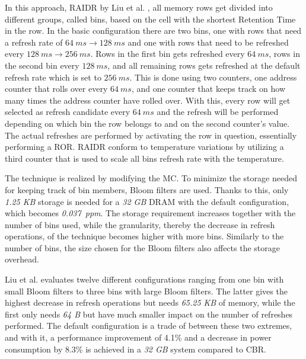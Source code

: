 In this approach, RAIDR by Liu et al. \cite{raidr}, all memory rows get divided into different groups, called bins, based on the cell with the shortest Retention Time in the row. In the basic configuration there are two bins, one with rows that need a refresh rate of $64\:ms \to 128\:ms$ and one with rows that need to be refreshed every $128\:ms \to 256\:ms$. Rows in the first bin gets refreshed every $64\:ms$, rows in the second bin every $128\:ms$, and all remaining rows gets refreshed at the default refresh rate which is set to $256\:ms$. This is done using two counters, one address counter that rolls over every $64\:ms$, and one counter that keeps track on how many times the address counter have rolled over. With this, every row will get selected as refresh candidate every $64\:ms$ and the refresh will be performed depending on which bin the row belongs to and on the second counter's value. The actual refreshes are performed by activating the row in question, essentially performing a ROR. RAIDR conform to temperature variations by utilizing a third counter that is used to scale all bins refresh rate with the temperature.

The technique is realized by modifying the MC. To minimize the storage needed for keeping track of bin members, Bloom filters are used. Thanks to this, only \textit{1.25 KB} storage is needed for a \textit{32 GB} DRAM with the default configuration, which becomes \textit{0.037~ppm}. The storage requirement increases together with the number of bins used, while the granularity, thereby the decrease in refresh operations, of the technique becomes higher with more bins. Similarly to the number of bins, the size chosen for the Bloom filters also affects the storage overhead. 

Liu et al. evaluates twelve different configurations ranging from one bin with small Bloom filters to three bins with large Bloom filters. The latter gives the highest decrease in refresh operations but needs \textit{65.25 KB} of memory, while the first only needs \textit{64 B} but have much smaller impact on the number of refreshes performed. The default configuration is a trade of between these two extremes, and with it, a performance improvement of 4.1\% and a decrease in power consumption by 8.3\% is achieved in a \textit{32 GB} system compared to CBR.